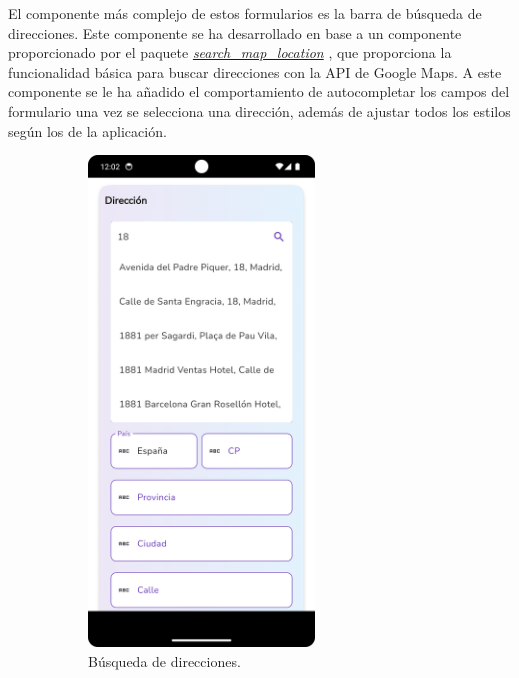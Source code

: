 \documentclass[a4paper, 12pt]{article}
\begin{document}
El componente más complejo de estos formularios es la barra de búsqueda de direcciones. Este componente se ha desarrollado en base a un componente proporcionado por el paquete \href{https://pub.dev/packages/search\_map\_location}{\textit{search\_map\_location}} \cite{search_map_location}, que proporciona la funcionalidad básica para buscar direcciones con la API de Google Maps. A este componente se le ha añadido el comportamiento de autocompletar los campos del formulario una vez se selecciona una dirección, además de ajustar todos los estilos según los de la aplicación.

\begin{figure}[H]
   	\begin{subfigure}{0.48\textwidth}
		\begin{center}
			{\includegraphics[width=6cm]{app/AddressSearcherOnSearch.png}\par}
			\caption{Búsqueda de direcciones.}
		\end{center}  
	\end{subfigure}\hfill
   	\begin{subfigure}{0.48\textwidth}
		\begin{center}

\end{center}
\end{subfigure}
\end{figure}
\end{document}
